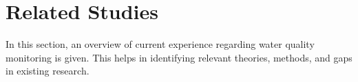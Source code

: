 \newpage
\section{Related Studies}
In this section, an overview of current experience regarding water quality monitoring is given. This helps in identifying relevant theories, methods, and gaps in existing research.



